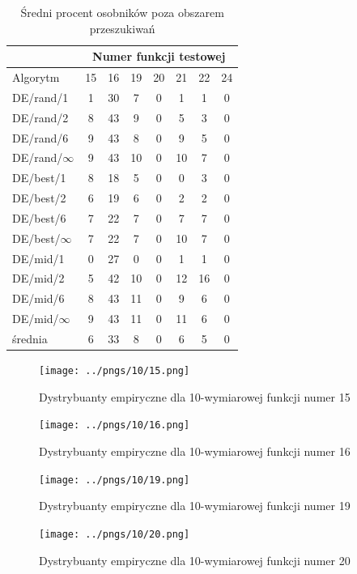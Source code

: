 \documentclass[a4paper,onecolumn,oneside,12pt,wide,floatssmall]{mwrep}
\theoremstyle{definition}
\theoremstyle{plain}%
\theoremstyle{remark}
\begin{document}
\begin{table}[H]
\centering
\begin{tabular}{ l | c | c | c | c | c | c | c }
		 & \multicolumn{7}{c}{Numer funkcji testowej}  \\  \hline
Algorytm         &15& 16& 19& 20& 21& 22& 24 \\ \hline
DE/rand/1	 & 1 & 30 & 7 & 0 & 1 & 1 & 0 \\
DE/rand/2	 & 8 & 43 & 9 & 0 & 5 & 3 & 0 \\
DE/rand/6	 & 9 & 43 & 8 & 0 & 9 & 5 & 0 \\
DE/rand/$\infty$ & 9 & 43 & 10 & 0 & 10 & 7 & 0 \\
DE/best/1	 & 8 & 18 & 5 & 0 & 0 & 3 & 0 \\
DE/best/2	 & 6 & 19 & 6 & 0 & 2 & 2 & 0 \\
DE/best/6	 & 7 & 22 & 7 & 0 & 7 & 7 & 0 \\
DE/best/$\infty$ & 7 & 22 & 7 & 0 & 10 & 7 & 0 \\
DE/mid/1         & 0 & 27 & 0 & 0 & 1 & 1 & 0 \\
DE/mid/2	 & 5 & 42 & 10 & 0 & 12 & 16 & 0 \\
DE/mid/6	 & 8 & 43 & 11 & 0 & 9 & 6 & 0 \\
DE/mid/$\infty$	 & 9 & 43 & 11 & 0 & 11 & 6 & 0 \\ \hline
średnia          & 6 & 33 & 8 & 0 & 6 & 5 & 0 \\              
\end{tabular}
\caption{Średni procent osobników poza obszarem przeszukiwań}
\end{table}

\begin{figure}[H]
\centering
\texttt{[image: ../pngs/10/15.png]}
\caption{Dystrybuanty empiryczne dla 10-wymiarowej funkcji numer 15}
\end{figure}

\begin{figure}[H]
\centering
\texttt{[image: ../pngs/10/16.png]} 
\caption{Dystrybuanty empiryczne dla 10-wymiarowej funkcji numer 16}
\end{figure}

\begin{figure}[H]
\centering
\texttt{[image: ../pngs/10/19.png]}
\caption{Dystrybuanty empiryczne dla 10-wymiarowej funkcji numer 19}
\end{figure}

\begin{figure}[H]
\centering
\texttt{[image: ../pngs/10/20.png]}
\caption{Dystrybuanty empiryczne dla 10-wymiarowej funkcji numer 20}
\end{figure}
\end{document}
